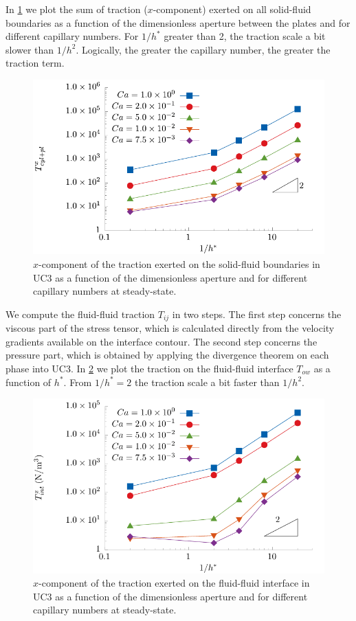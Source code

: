 \documentclass[]{article}
\begin{document}
In \cref{fig:drag_solid} we plot the sum of traction (\(x\)-component)
exerted on all solid-fluid boundaries as a function of the dimensionless
aperture between the plates and for different capillary numbers. For
\(1/h^*\) greater than 2, the traction scale a bit slower than
\(1/h^2\). Logically, the greater the capillary number, the greater the
traction term.

\begin{figure}
\hypertarget{fig:drag_solid}{%
\centering
\includegraphics{figures/pdf/drag_solid.pdf}
\caption{\(x\)-component of the traction exerted on the solid-fluid
boundaries in UC3 as a function of the dimensionless aperture and for
different capillary numbers at steady-state.}\label{fig:drag_solid}
}
\end{figure}

We compute the fluid-fluid traction \(T_{ij}\) in two steps. The first
step concerns the viscous part of the stress tensor, which is calculated
directly from the velocity gradients available on the interface contour.
The second step concerns the pressure part, which is obtained by
applying the divergence theorem on each phase into UC3. In
\cref{fig:drag_fluidint} we plot the traction on the fluid-fluid
interface \(T_{ow}\) as a function of \(h^*\). From \(1/h^*=2\) the
traction scale a bit faster than \(1/h^2\).

\begin{figure}
\hypertarget{fig:drag_fluidint}{%
\centering
\includegraphics{figures/pdf/drag_fluidint.pdf}
\caption{\(x\)-component of the traction exerted on the fluid-fluid
interface in UC3 as a function of the dimensionless aperture and for
different capillary numbers at steady-state.}\label{fig:drag_fluidint}
}
\end{figure}
\end{document}
